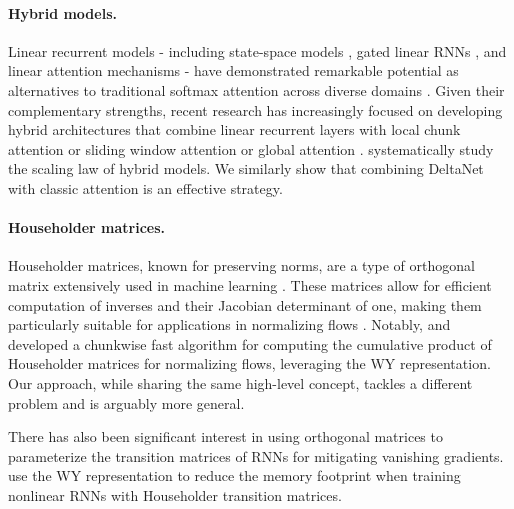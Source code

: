 \paragraph{Hybrid models.}  Linear recurrent models - including state-space models \cite{s4, s5, gu_mamba_2023, pretrain_wo_attn}, gated linear RNNs \cite{parallel-martin, HGRN}, and linear attention mechanisms \cite{katharopoulos_transformers_2020, yang_gated_2023} - have demonstrated remarkable potential as alternatives to traditional softmax attention across diverse domains \cite{Yan2023DiffusionMW, Zhu2024DiGSA, Liao2024ViGLV, Zhu2024VisionME, Wang2024GraphMambaTL, Schiff2024CaduceusBE}. Given their complementary strengths, recent research has increasingly focused on developing hybrid architectures that combine linear recurrent layers with local chunk attention \cite{Ma2022MegaMA, zhang-etal-2023-efficient-long, Fathi2023BlockStateT, Ma2024MegalodonEL, munkhdalai2024leave} or sliding window attention \cite{zhang-etal-2023-efficient-long, arora_simple_2024, de_griffin_2024, ren2024samba} or global attention \cite{lei_when_2021, Lei2022SimpleRI, huang_encoding_2022, fu_hungry_2023, Lieber2024JambaAH, Park2024CanML, Sun2024YouOC}.  \citet{poli_mechanistic_2024} systematically study the scaling law of hybrid models. We similarly show that combining DeltaNet with classic attention is an effective strategy.



\paragraph{Householder matrices.}
Householder matrices, known for preserving norms, are a type of orthogonal matrix extensively used in machine learning \cite{mathiasen_faster_nodate,mhammedi_efficient_2017,zhang_stabilizing_2018,tomczak_improving_2017,qin_linearized_2023,berg_sylvester_2019}. These matrices allow for  efficient computation of inverses and their Jacobian determinant of one, making them particularly suitable for applications in normalizing flows \cite{mathiasen_faster_nodate,berg_sylvester_2019}. Notably, \citet{mathiasen_faster_nodate} and  \citet{Mathiasen2020WhatIN} developed a chunkwise fast algorithm for computing the cumulative product of Householder matrices for normalizing flows, leveraging the WY representation. Our approach, while sharing the same high-level concept, tackles a different problem and is arguably more general.

There has also been significant interest in using orthogonal matrices to parameterize the transition matrices of RNNs \cite{mhammedi_efficient_2017,jing_gated_2019,vorontsov_orthogonality_2016,helfrich_orthogonal_2018} for mitigating vanishing gradients.  \citet{mhammedi_efficient_2017} use the WY representation to reduce the memory footprint when training nonlinear RNNs with Householder transition matrices.

